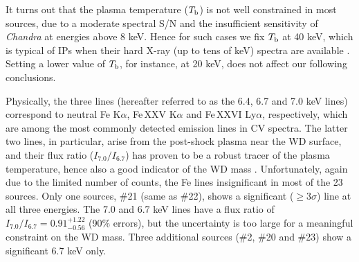 \documentclass[fleqn,usenatbib]{mnras}
\begin{document}
It turns out that the plasma temperature ($T_{\rm b}$) is not well constrained in most sources, due to a moderate spectral S/N and the insufficient sensitivity of {\it Chandra} at energies above 8 keV. Hence for such cases we fix $T_{\rm b}$ at 40 keV, which is typical of IPs when their hard X-ray (up to tens of keV) spectra are available \citep{2016ApJ...818..136X,2016ApJ...826..160H}.
Setting a lower value of $T_{\rm b}$, for instance, at 20 keV, does not affect our following conclusions.

Physically, the three lines (hereafter referred to as the 6.4, 6.7 and 7.0 keV lines) correspond to neutral Fe K$\alpha$, Fe\,XXV K$\alpha$ and Fe\,XXVI Ly$\alpha$, respectively, which are among the most commonly detected emission lines in CV spectra. The latter two lines, in particular, arise from the post-shock plasma near the WD surface, and their flux ratio ($I_{7.0}/I_{6.7}$) has proven to be a robust tracer of the plasma temperature, hence also a good indicator of the WD mass \citep{1997ApJ...474..774F,1999ApJS..120..277E,2016ApJ...818..136X}.
Unfortunately, again due to the limited number of counts, the Fe lines insignificant in most of the 23 sources.
Only one sources, \#21 (same as \#22), shows a significant ($\geq 3 \sigma$) line at all three energies. The 7.0 and 6.7 keV lines have a flux ratio of $I_{7.0}/I_{6.7} = 0.91^{+1.22}_{-0.56}$ (90\% errors), but the uncertainty is too large for a meaningful constraint on the WD mass. Three additional sources (\#2, \#20 and \#23) show a significant 6.7 keV only.   




\end{document}
